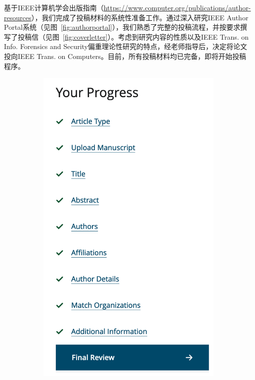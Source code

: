 \documentclass[11pt,a4paper]{article}
\begin{document}
基于IEEE计算机学会出版指南（\url{https://www.computer.org/publications/author-resources}），我们完成了投稿材料的系统性准备工作。通过深入研究IEEE Author Portal系统（见图~\ref{fig:authorportal}），我们熟悉了完整的投稿流程，并按要求撰写了投稿信（见图~\ref{fig:coverletter}）。考虑到研究内容的性质以及IEEE Trans. on Info. Forensics and Security偏重理论性研究的特点，经老师指导后，决定将论文投向IEEE Trans. on Computers。目前，所有投稿材料均已完备，即将开始投稿程序。
\begin{figure}[h]
  \centering
  \begin{subfigure}[b]{0.2\textwidth}
    \centering
    \includegraphics[width=\textwidth]{./fig/submit.png}

\end{subfigure}
\end{figure}
\end{document}
